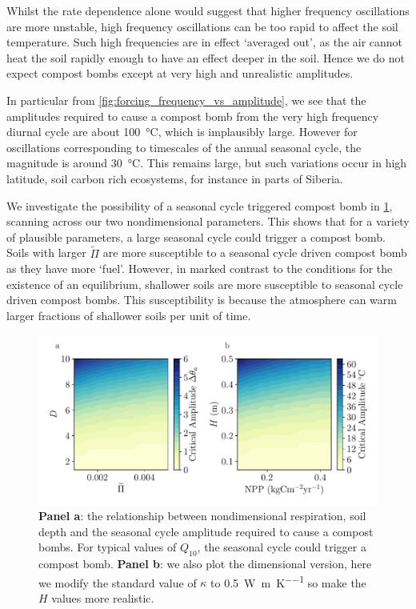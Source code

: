 Whilst the rate dependence alone would suggest that higher frequency oscillations are more unstable,
high frequency oscillations can be too rapid to affect the soil temperature. Such high frequencies are in effect `averaged out', as the air cannot heat the soil rapidly enough to
have an effect deeper in the soil. Hence we do not expect compost bombs except at very high and unrealistic amplitudes.

In particular from \cref{fig:forcing_frequency_vs_amplitude}, we see that
the amplitudes required to cause a compost bomb from the very high frequency diurnal cycle are about \SI{100}{\degreeCelsius}, which is implausibly large.
However for oscillations corresponding to timescales of the annual seasonal cycle, the magnitude is around \SI{30}{\degreeCelsius}. This remains large,
but such variations occur in high latitude, soil carbon rich ecosystems, for instance in parts of Siberia\cite{Peixoto1992}.

We investigate the possibility of a seasonal cycle triggered compost bomb in \cref{fig:critical_amplitude_to_be_triggered_by_the_seasonal_cycle}, scanning across our two nondimensional parameters.
This shows that for a variety of plausible parameters, a large seasonal cycle could trigger a compost bomb. Soils with larger $\widetilde{\Pi}$ are more susceptible to a seasonal
cycle driven compost bomb as they have more `fuel'. However, in marked contrast to the conditions for the existence of an equilibrium, shallower soils are more susceptible to seasonal cycle driven
compost bombs. This susceptibility is because the atmosphere can warm larger fractions of shallower soils per unit of time.


\begin{figure}
  \centering
  \includegraphics[scale=0.5,keepaspectratio]{seasonal_dim_and_nondim}
  \caption{\textbf{Panel a}: the relationship between nondimensional respiration, soil depth and the seasonal cycle amplitude required to cause a compost bombs.
    For typical values of $Q_{10}$, the seasonal cycle could trigger a compost bomb. \textbf{Panel b}: we also plot the dimensional version, here we modify the standard value
    of $\kappa$ to \SI{0.5}{\watt\per\meter\per\kelvin} so make the $H$ values more realistic.}
  \label{fig:critical_amplitude_to_be_triggered_by_the_seasonal_cycle}
\end{figure}

